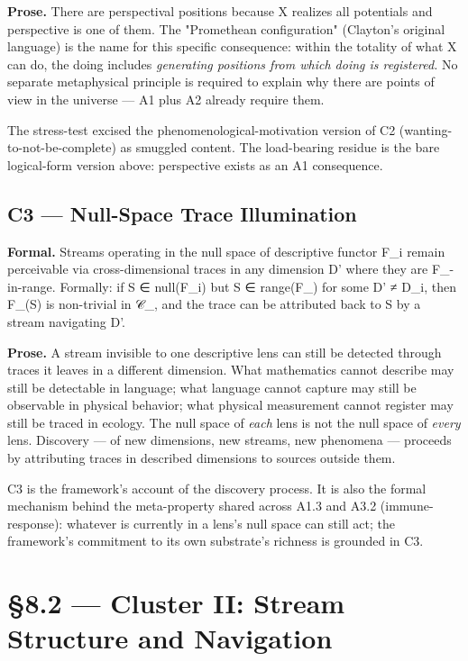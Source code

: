 \documentclass[11pt, openany]{book}
\newcommand{\sectionbreak}{\clearpage}
\begin{document}
\textbf{Prose.} There are perspectival positions because X realizes all potentials and perspective is one of them. The "Promethean configuration" (Clayton's original language) is the name for this specific consequence: within the totality of what X can do, the doing includes \textit{generating positions from which doing is registered.} No separate metaphysical principle is required to explain why there are points of view in the universe --- A1 plus A2 already require them.

The stress-test excised the phenomenological-motivation version of C2 (wanting-to-not-be-complete) as smuggled content. The load-bearing residue is the bare logical-form version above: perspective exists as an A1 consequence.

\subsection{C3 --- Null-Space Trace Illumination}

\textbf{Formal.} Streams operating in the null space of descriptive functor F\_\allowbreak{}i remain perceivable via cross-dimensional traces in any dimension D' where they are F\_-in-range. Formally: if S ∈ null(F\_\allowbreak{}i) but S ∈ range(F\_) for some D' ≠ D\_\allowbreak{}i, then F\_(S) is non-trivial in 𝒞\_, and the trace can be attributed back to S by a stream navigating D'.

\textbf{Prose.} A stream invisible to one descriptive lens can still be detected through traces it leaves in a different dimension. What mathematics cannot describe may still be detectable in language; what language cannot capture may still be observable in physical behavior; what physical measurement cannot register may still be traced in ecology. The null space of \textit{each} lens is not the null space of \textit{every} lens. Discovery --- of new dimensions, new streams, new phenomena --- proceeds by attributing traces in described dimensions to sources outside them.

C3 is the framework's account of the discovery process. It is also the formal mechanism behind the meta-property shared across A1.3 and A3.2 (immune-response): whatever is currently in a lens's null space can still act; the framework's commitment to its own substrate's richness is grounded in C3.

\sectionbreak

\section{§8.2 --- Cluster II: Stream Structure and Navigation}
\end{document}
